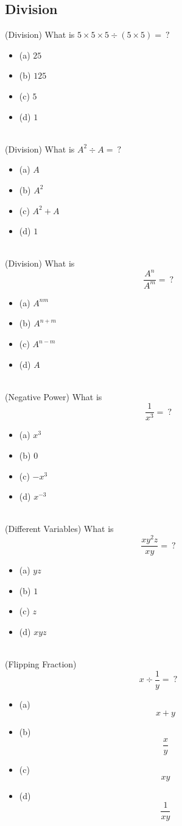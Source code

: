 \documentclass{article}
\begin{document}
\subsection{Division}
(Division) What is $5 \times 5 \times 5 \div (5 \times 5) = \ ?$
\begin{itemize}
\item[](a) $25$
\item[](b) $125$
\item[](c) $5$
\item[](d) $1$
\end{itemize} \hrulefill \\[10pt]
\newpage
\noindent (Division) What is $A^2 \div A = \ ?$ 
\begin{itemize}
\item[](a) $A$
\item[](b) $A^2$
\item[](c) $A^2 + A$
\item[](d) $1$
\end{itemize} \hrulefill \\[10pt]
(Division) What is $$\frac{A^n}{A^m} = \ ?$$
\begin{itemize}
\item[](a) $A^{nm}$
\item[](b) $A^{n+m}$
\item[](c) $A^{n-m}$
\item[](d) $A$
\end{itemize} \hrulefill \\[10pt]
(Negative Power) What is $$\frac{1}{x^3} = \ ?$$
\begin{itemize}
\item[](a) $x^3$
\item[](b) $0$
\item[](c) $-x^3$
\item[](d) $x^{-3}$
\end{itemize} \hrulefill \\[10pt]
(Different Variables) What is $$\frac{xy^2z}{xy} = \ ?$$
\begin{itemize}
\item[](a) $yz$ 
\item[](b) $1$
\item[](c) $z$
\item[](d) $xyz$
\end{itemize} \hrulefill \\[10pt]
(Flipping Fraction) $$x \div \frac{1}{y} = \ ?$$ 
\begin{itemize}
\item[](a) $$x+y$$ 
\item[](b) $$\frac{x}{y}$$
\item[](c) $$xy$$
\item[](d) $$\frac{1}{xy}$$
\end{itemize} \hrulefill \\[10pt]
\end{document}
